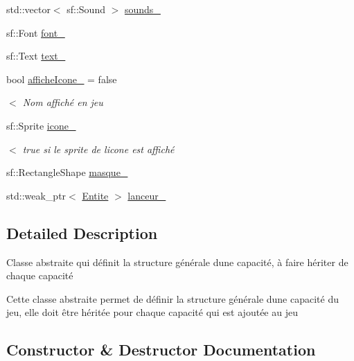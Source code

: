 \begin{DoxyCompactItemize}
std\+::vector$<$ sf\+::\+Sound $>$ \mbox{\hyperlink{class_capacite_a12ec756b46ceb4f251fac70f61874b3b}{sounds\+\_\+}}
\item 
sf\+::\+Font \mbox{\hyperlink{class_capacite_abb8abeff4070e7337cb8e42faa93c66f}{font\+\_\+}}
\item 
sf\+::\+Text \mbox{\hyperlink{class_capacite_ad76ace2cf7ece150cd533bba193e262b}{text\+\_\+}}
\item 
bool \mbox{\hyperlink{class_capacite_a5d4f1d24e9ecfbfacc0bafc5ae508f2c}{affiche\+Icone\+\_\+}} = false
\begin{DoxyCompactList}\small\item\em $<$ Nom affiché en jeu \end{DoxyCompactList}\item 
sf\+::\+Sprite \mbox{\hyperlink{class_capacite_ac56e7b3dc7a5a00fa5b4486a5cb457f8}{icone\+\_\+}}
\begin{DoxyCompactList}\small\item\em $<$ true si le sprite de l\textquotesingle{}icone est affiché \end{DoxyCompactList}\item 
sf\+::\+Rectangle\+Shape \mbox{\hyperlink{class_capacite_af256cf39048f6b10f6f7e81ba0f62432}{masque\+\_\+}}
\item 
std\+::weak\+\_\+ptr$<$ \mbox{\hyperlink{class_entite}{Entite}} $>$ \mbox{\hyperlink{class_capacite_ac5c0fb8a5251d7be2b1e86adaa3eaf86}{lanceur\+\_\+}}
\end{DoxyCompactItemize}


\subsection{Detailed Description}
Classe abstraite qui définit la structure générale d\textquotesingle{}une capacité, à faire hériter de chaque capacité 

Cette classe abstraite permet de définir la structure générale d\textquotesingle{}une capacité du jeu, elle doit être héritée pour chaque capacité qui est ajoutée au jeu 

\subsection{Constructor \& Destructor Documentation}
\mbox{\label{class_capacite_af1279c795ea1d1d157cf3cad846d374e}} 
